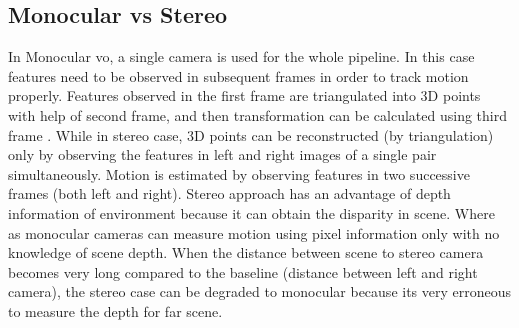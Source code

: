 \subsection{Monocular vs Stereo}
In Monocular \acrshort{vo}, a single camera is used for the whole pipeline. In this case features need to be observed in subsequent frames in order to track motion properly. Features observed in the first frame are triangulated into 3D points with help of second frame, and then transformation can be calculated using third frame \cite{KhalidYousif-et-al-2015}. While in stereo case, 3D points can be reconstructed (by triangulation) only by observing the features in left and right images of a single pair simultaneously. Motion is estimated by observing features in two successive frames (both left and right). Stereo approach has an advantage of depth information of environment because it can obtain the disparity in scene. Where as monocular cameras can measure motion using pixel information only with no knowledge of scene depth. When the distance between scene to stereo camera becomes very long compared to the baseline (distance between left and right camera), the stereo case can be degraded to monocular because its very erroneous to measure the depth for far scene. 

